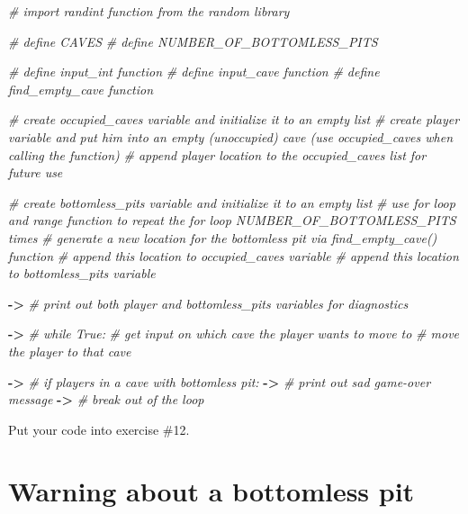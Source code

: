 \documentclass[
]{book}
\newenvironment{Shaded}{\begin{snugshade}}{\end{snugshade}}
\newcommand{\CommentTok}[1]{\textcolor[rgb]{0.56,0.35,0.01}{\textit{#1}}}
\newcommand{\OperatorTok}[1]{\textcolor[rgb]{0.81,0.36,0.00}{\textbf{#1}}}
\begin{document}
\begin{Shaded}
\begin{Highlighting}[]
\CommentTok{\# import randint function from the random library}

\CommentTok{\# define CAVES}
\CommentTok{\# define NUMBER\_OF\_BOTTOMLESS\_PITS}

\CommentTok{\# define input\_int function}
\CommentTok{\# define input\_cave function}
\CommentTok{\# define find\_empty\_cave function}

\CommentTok{\# create \textasciigrave{}occupied\_caves\textasciigrave{} variable and initialize it to an empty list}
\CommentTok{\# create \textasciigrave{}player\textasciigrave{} variable and put him into an empty (unoccupied) cave (use \textasciigrave{}occupied\_caves\textasciigrave{} when calling the function)}
\CommentTok{\# append player location to the \textasciigrave{}occupied\_caves\textasciigrave{} list for future use}

\CommentTok{\# create \textasciigrave{}bottomless\_pits\textasciigrave{} variable and initialize it to an empty list}
\CommentTok{\# use for loop and range function to repeat the for loop NUMBER\_OF\_BOTTOMLESS\_PITS times}
\CommentTok{\#     generate a new location for the bottomless pit via find\_empty\_cave() function}
\CommentTok{\#     append this location to \textasciigrave{}occupied\_caves\textasciigrave{} variable}
\CommentTok{\#     append this location to \textasciigrave{}bottomless\_pits\textasciigrave{} variable}

\OperatorTok{{-}\textgreater{}} \CommentTok{\# print out both player and bottomless\_pits variables for diagnostics}

\OperatorTok{{-}\textgreater{}} \CommentTok{\# while True:}
    \CommentTok{\# get input on which cave the player wants to move to}
    \CommentTok{\# move the player to that cave}
    
    \OperatorTok{{-}\textgreater{}} \CommentTok{\# if players in a cave with bottomless pit:}
    \OperatorTok{{-}\textgreater{}}      \CommentTok{\# print out sad game{-}over message}
    \OperatorTok{{-}\textgreater{}}      \CommentTok{\# break out of the loop}
\end{Highlighting}
\end{Shaded}

Put your code into exercise \#12.

\hypertarget{warning-about-a-bottomless-pit}{%
\section{Warning about a bottomless pit}\label{warning-about-a-bottomless-pit}}
\end{document}
